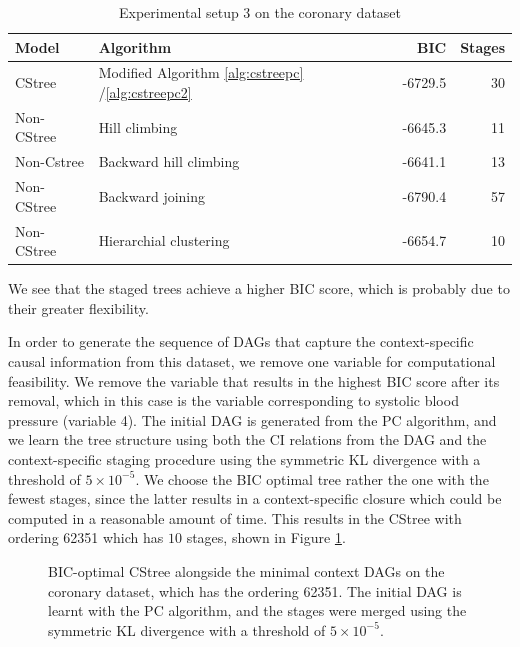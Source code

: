 \documentclass{tufte-book}
\begin{document}
\begin{table}[htbp]
\caption{\label{tab:org17871aa}Experimental setup 3 on the coronary dataset}
\centering
\begin{tabular}{l|l|r|r}
\hline
Model & Algorithm & BIC & Stages\\
\hline
CStree & Modified Algorithm \ref{alg:cstreepc} /\ref{alg:cstreepc2} & -6729.5 & 30\\
Non-CStree & Hill climbing & -6645.3 & 11\\
Non-Cstree & Backward hill climbing & -6641.1 & 13\\
Non-CStree & Backward joining & -6790.4 & 57\\
Non-CStree & Hierarchial clustering & -6654.7 & 10\\
\end{tabular}
\end{table}



We see that the staged trees achieve a higher BIC score, which is probably due to their greater flexibility.


In order to generate the sequence of DAGs that capture the context-specific causal information from this dataset, we remove one variable for computational feasibility. We remove the variable that results in the highest BIC score after its removal, which in this case is the variable corresponding to systolic blood pressure (variable 4). The initial DAG is generated from the PC algorithm, and we learn the tree structure using both the CI relations from the DAG and the context-specific staging procedure using the symmetric KL divergence with a threshold of \(5\times 10^{-5}\). We choose the BIC optimal tree rather the one with the fewest stages, since the latter results in a context-specific closure which could be computed in a reasonable amount of time.  This results in the CStree with ordering 62351 which has \(10\) stages, shown in Figure \ref{fig:coronary_wout4}. 


\begin{figure}[!h]\label{fig:coronary_wout4}
   \begin{floatrow}
%
\caption{BIC-optimal CStree alongside the minimal context DAGs on the coronary dataset, which has the ordering 62351. The initial DAG is learnt with the PC algorithm, and the stages were merged using the symmetric KL divergence with a threshold of $5\times 10^{-5}$. }
        
   \end{floatrow}
\end{figure}
\end{document}
